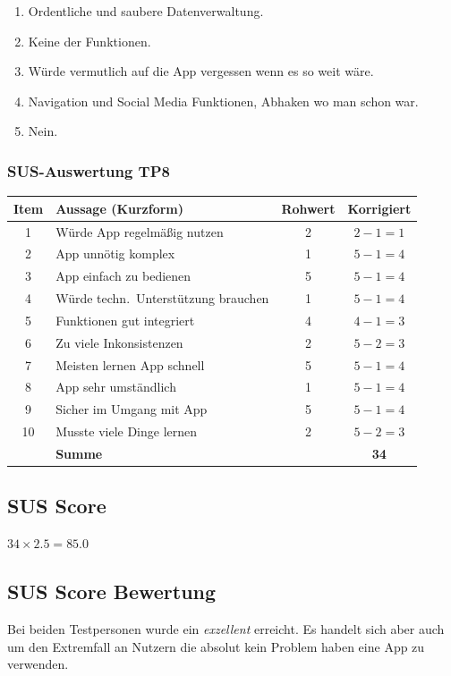 \documentclass{article}
\begin{document}
\begin{enumerate}
	\item Ordentliche und saubere Datenverwaltung.
	\item Keine der Funktionen.
	\item Würde vermutlich auf die App vergessen wenn es so weit wäre.
	\item Navigation und Social Media Funktionen, Abhaken wo man schon war.
	\item Nein.
\end{enumerate}

\subsubsection*{SUS-Auswertung TP8}
\begin{tabular}{@{}clcc@{}}
  \hline
  \textbf{Item} & \textbf{Aussage (Kurzform)} & \textbf{Rohwert} & \textbf{Korrigiert} \\
  \hline
  1  & Würde App regelmäßig nutzen          & 2 & $2-1=1$ \\
  2  & App unnötig komplex                  & 1 & $5-1=4$ \\
  3  & App einfach zu bedienen              & 5 & $5-1=4$ \\
  4  & Würde techn.\ Unterstützung brauchen & 1 & $5-1=4$ \\
  5  & Funktionen gut integriert            & 4 & $4-1=3$ \\
  6  & Zu viele Inkonsistenzen              & 2 & $5-2=3$ \\
  7  & Meisten lernen App schnell           & 5 & $5-1=4$ \\
  8  & App sehr umständlich                 & 1 & $5-1=4$ \\
  9  & Sicher im Umgang mit App             & 5 & $5-1=4$ \\
  10 & Musste viele Dinge lernen            & 2 & $5-2=3$ \\
  \hline
     & \textbf{Summe}                       &   & \textbf{34} \\
  \hline
\end{tabular}
\subsection*{SUS Score}
$34 \times 2.5 = 85.0$

\subsection*{SUS Score Bewertung}
Bei beiden Testpersonen wurde ein \emph{exzellent} erreicht. Es handelt sich aber auch um den Extremfall an Nutzern die absolut kein Problem haben eine App zu verwenden.
%
\end{document}
